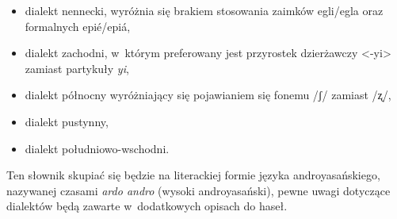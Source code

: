 \begin{spacing}{1.1}
\begin{itemize}
    \item dialekt nennecki, wyróżnia się brakiem stosowania zaimków egli/egla oraz formalnych epié/epiá,
    \item dialekt zachodni, w~którym preferowany jest przyrostek dzierżawczy <-yi> zamiast partykuły \emph{yi},
    \item dialekt północny wyróżniający się pojawianiem się fonemu /ʃ/ zamiast /ʐ/,
    \item dialekt pustynny,
    \item dialekt południowo-wschodni.
\end{itemize}

Ten słownik skupiać się będzie na literackiej formie języka androyasańskiego, 
nazywanej czasami \emph{ardo andro} (wysoki androyasański), pewne uwagi 
dotyczące dialektów będą zawarte w~dodatkowych opisach do haseł.

\end{spacing}